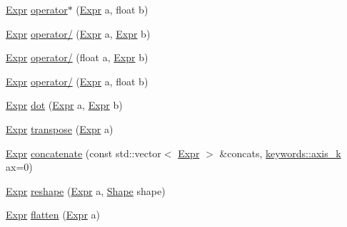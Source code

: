 \begin{DoxyCompactItemize}
\item 
\hyperlink{namespacemarian_a498d8baf75b754011078b890b39c8e12}{Expr} \hyperlink{namespacemarian_a80d27bc20c3653d6d7882f9087f10390}{operator$\ast$} (\hyperlink{namespacemarian_a498d8baf75b754011078b890b39c8e12}{Expr} a, float b)
\item 
\hyperlink{namespacemarian_a498d8baf75b754011078b890b39c8e12}{Expr} \hyperlink{namespacemarian_a1b719c7a542512dbc5a589f92114be62}{operator/} (\hyperlink{namespacemarian_a498d8baf75b754011078b890b39c8e12}{Expr} a, \hyperlink{namespacemarian_a498d8baf75b754011078b890b39c8e12}{Expr} b)
\item 
\hyperlink{namespacemarian_a498d8baf75b754011078b890b39c8e12}{Expr} \hyperlink{namespacemarian_a06c2e6bdcd86d1d0466591b05cc7c0d0}{operator/} (float a, \hyperlink{namespacemarian_a498d8baf75b754011078b890b39c8e12}{Expr} b)
\item 
\hyperlink{namespacemarian_a498d8baf75b754011078b890b39c8e12}{Expr} \hyperlink{namespacemarian_a4d70c319f9e3a8de38cb564fd92c9944}{operator/} (\hyperlink{namespacemarian_a498d8baf75b754011078b890b39c8e12}{Expr} a, float b)
\item 
\hyperlink{namespacemarian_a498d8baf75b754011078b890b39c8e12}{Expr} \hyperlink{namespacemarian_ad7fbf1ba8e2e04ffdc7d5e4841b5e691}{dot} (\hyperlink{namespacemarian_a498d8baf75b754011078b890b39c8e12}{Expr} a, \hyperlink{namespacemarian_a498d8baf75b754011078b890b39c8e12}{Expr} b)
\item 
\hyperlink{namespacemarian_a498d8baf75b754011078b890b39c8e12}{Expr} \hyperlink{namespacemarian_a00669690ef16ce9b1bde5ee9d1b77ac6}{transpose} (\hyperlink{namespacemarian_a498d8baf75b754011078b890b39c8e12}{Expr} a)
\item 
\hyperlink{namespacemarian_a498d8baf75b754011078b890b39c8e12}{Expr} \hyperlink{namespacemarian_a2791a2c8f79a938f5cb22ae613680675}{concatenate} (const std\+::vector$<$ \hyperlink{namespacemarian_a498d8baf75b754011078b890b39c8e12}{Expr} $>$ \&concats, \hyperlink{namespacemarian_1_1keywords_a10b8b729f40b2bc6f4b9d1f4486d03a4}{keywords\+::axis\+\_\+k} ax=0)
\item 
\hyperlink{namespacemarian_a498d8baf75b754011078b890b39c8e12}{Expr} \hyperlink{namespacemarian_acd984f43188d0ae23c2a6ef13ae5293f}{reshape} (\hyperlink{namespacemarian_a498d8baf75b754011078b890b39c8e12}{Expr} a, \hyperlink{structmarian_1_1Shape}{Shape} shape)
\item 
\hyperlink{namespacemarian_a498d8baf75b754011078b890b39c8e12}{Expr} \hyperlink{namespacemarian_aea8d2acadf0d96f6e455addd57cba80d}{flatten} (\hyperlink{namespacemarian_a498d8baf75b754011078b890b39c8e12}{Expr} a)

\end{DoxyCompactItemize}
